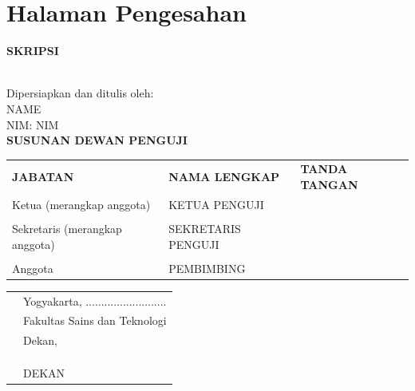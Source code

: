 \documentclass[oneside,12pt, a4paper]{book}
\def\title{TITLE}
\def\author{NAME}
\def\nim{NIM}
\def\pembimbing{PEMBIMBING}
\def\ketuapenguji{KETUA PENGUJI}
\def\sekretarispenguji{SEKRETARIS PENGUJI}
\def\dekan{DEKAN}
\numberwithin{equation}{chapter}
\begin{document}

\clearpage
\chapter{\centering Halaman Pengesahan}
\begin{center}
	
	\normalsize
	\vspace{1cm}
	\textbf{SKRIPSI}\\
	\vspace{0.5cm}
	
	\MakeMarkcase{\textbf{\title}}\\
	
	\vspace{2cm}
	Dipersiapkan dan ditulis oleh:\\
	\author\\
	NIM: \nim\\
	
	\vspace{2cm}
	\textbf{SUSUNAN DEWAN PENGUJI}\\
	
	
	\vspace{1cm}
	\begin{tabularx}{\textwidth}{
			>{\raggedright\arraybackslash}m{2cm}
			>{\raggedright\arraybackslash}m{7cm}
			>{\raggedright\arraybackslash}X
		}
		\renewcommand{\arraystretch}{2.3}
		\textbf{JABATAN} &  \centering\textbf{NAMA LENGKAP} & \textbf{TANDA TANGAN}\\

		Ketua (merangkap anggota) & \ketuapenguji & \\
		& &\\
		Sekretaris (merangkap anggota) & \sekretarispenguji & \\
		& &\\
		Anggota & \pembimbing & 
	\end{tabularx}
	
	\vspace{3cm}
	
	\begin{tabularx}{\textwidth}{
		>{\raggedright\arraybackslash}m{5cm}
		>{\raggedleft\arraybackslash}X
		}
		& Yogyakarta, ..........................\\
		& Fakultas Sains dan Teknologi \\
		& Dekan,\\
		&\\
		&\\
		&\\
		& \dekan
	\end{tabularx}
\end{center}
\end{document}
